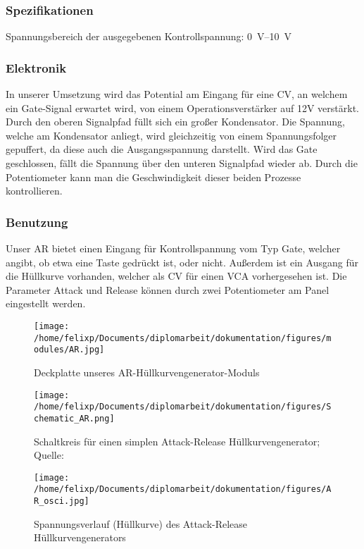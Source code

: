 \subsubsection{Spezifikationen}
\label{sec:orga834a32}
Spannungsbereich der ausgegebenen Kontrollspannung: \SIrange{0}{10}{\volt}

\subsubsection{Elektronik}
\label{sec:org94363bf}
In unserer Umsetzung wird das Potential am Eingang für eine \acl{CV}, an welchem ein Gate-Signal erwartet wird, von einem Operationsverstärker auf 12V verstärkt. Durch den oberen Signalpfad füllt sich ein großer Kondensator. Die Spannung, welche am Kondensator anliegt, wird gleichzeitig von einem Spannungsfolger gepuffert, da diese auch die Ausgangsspannung darstellt. Wird das Gate geschlossen, fällt die Spannung über den unteren Signalpfad wieder ab. Durch die Potentiometer kann man die Geschwindigkeit dieser beiden Prozesse kontrollieren.

\newpage

\subsubsection{Benutzung}
\label{sec:org8855515}
Unser AR bietet einen Eingang für Kontrollspannung vom Typ Gate, welcher angibt, ob etwa eine Taste gedrückt ist, oder nicht. Außerdem ist ein Ausgang für die Hüllkurve vorhanden, welcher als \acl{CV} für einen \ac{VCA} vorhergesehen ist. Die Parameter Attack und Release können durch zwei Potentiometer am Panel eingestellt werden.

\begin{figure}[hp]
\centering
\texttt{[image: /home/felixp/Documents/diplomarbeit/dokumentation/figures/modules/AR.jpg]}
\caption{Deckplatte unseres AR-Hüllkurvengenerator-Moduls}
\end{figure}

\newpage

\begin{figure}[hp]
\centering
\texttt{[image: /home/felixp/Documents/diplomarbeit/dokumentation/figures/Schematic\_AR.png]}
\caption{Schaltkreis für einen simplen Attack-Release Hüllkurvengenerator; Quelle: \cite{synthnerd:ar}}
\end{figure}

\begin{figure}[hp]
\centering
\texttt{[image: /home/felixp/Documents/diplomarbeit/dokumentation/figures/AR\_osci.jpg]}
\caption{\label{fig:orgd229f98}Spannungsverlauf (Hüllkurve) des Attack-Release Hüllkurvengenerators}
\end{figure}
